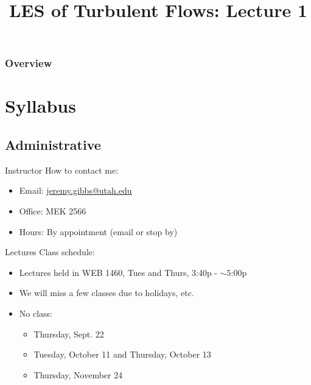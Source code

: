 
\title{LES of Turbulent Flows: Lecture 1}



\begin{frame} 
  \titlepage
\end{frame}


\begin{frame}
\frametitle{Overview}
\tableofcontents
\end{frame}

\section{Syllabus} %
\subsection{Administrative}
\begin{frame}{Instructor}
How to contact me:

\begin{itemize}
\item Email: \href{mailto:jeremy.gibbs@utah.edu}{\color{UUcrimson}\underline{jeremy.gibbs@utah.edu}}
\item Office: MEK 2566
\item Hours: By appointment (email or stop by)
\end{itemize}
\end{frame}


\begin{frame}{Lectures}
Class schedule:

\begin{itemize}
\item Lectures held in WEB 1460, Tues and Thurs, 3:40p - $\sim 5$:00p
\item We will miss a few classes due to holidays, etc. 
\item No class:
\begin{itemize}
\item Thursday, Sept. 22
\item Tuesday, October 11 and Thursday, October 13
\item Thursday, November 24 
\end{itemize}
\end{itemize}
\end{frame}

